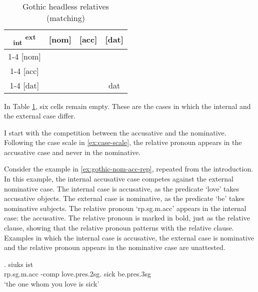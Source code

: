 \begin{table}[H]
 \center
 \caption{Gothic headless relatives (matching)}
 \begin{tabular}{c|c|c|c}
   \toprule
    \textsubscript{\ac{int}} \textsuperscript{\ac{ext}}
         & [\ac{nom}]
         & [\ac{acc}]
         & [\ac{dat}]
         \\ \cmidrule{1-4}
     [\ac{nom}]
         & \cellcolor{LG}{\ac{nom}}
         &
         &
         \\ \cmidrule{1-4}
     [\ac{acc}]
         &
         & \cellcolor{DG}{\ac{acc}}
         &
         \\ \cmidrule{1-4}
     [\ac{dat}]
         &
         &
         & \ac{dat}
         \\
   \bottomrule
 \end{tabular}
   \label{tbl:summary-gothic-matching}
\end{table}

In Table \ref{tbl:summary-gothic-matching}, six cells remain empty. These are the cases in which the internal and the external case differ.

I start with the competition between the accusative and the nominative. Following the case scale in \ref{ex:case-scale}, the relative pronoun appears in the accusative case and never in the nominative.

Consider the example in \ref{ex:gothic-nom-acc-rep}, repeated from the introduction. In this example, the internal accusative case competes against the external nominative case.
The internal case is accusative, as the predicate  `love' takes accusative objects.
The external case is nominative, as the predicate  `be' takes nominative subjects.
The relative pronoun  `\ac{rp}.\ac{sg}.\ac{m}.\ac{acc}' appears in the internal case: the accusative. The relative pronoun is marked in bold, just as the relative clause, showing that the relative pronoun patterns with the relative clause.
Examples in which the internal case is accusative, the external case is nominative and the relative pronoun appears in the nominative case are unattested.

\exg.    siuks ist\\
 \ac{rp}.\ac{sg}.\ac{m}.\ac{acc} -\ac{comp} love.\ac{pres}.2\ac{sg}.\scsub{[acc]} sick be.\ac{pres}.3\ac{sg}\scsub{[nom]}\\
 `the one whom you love is sick' \label{ex:gothic-nom-acc-rep}

